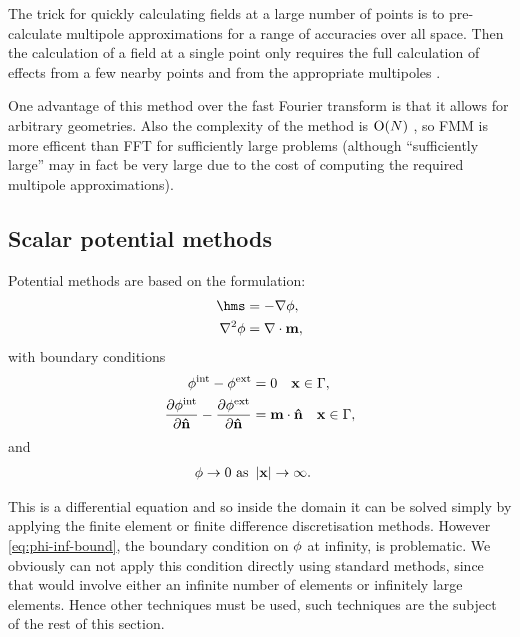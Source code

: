 The trick for quickly calculating fields at a large number of points is to pre-calculate multipole approximations for a range of accuracies over all space.
Then the calculation of a field at a single point only requires the full calculation of effects from a few nearby points and from the appropriate multipoles \cite{Beatson1997}.

One advantage of this method over the fast Fourier transform is that it allows for arbitrary geometries.
Also the complexity of the method is $\text{O}{\left( N \right)}$ \cite{Chang2011}, so FMM is more efficent than FFT for sufficiently large problems (although ``sufficiently large'' may in fact be very large due to the cost of computing the required multipole approximations).


\subsection{Scalar potential methods}
\label{sec:magstat-field-calc-pote}

Potential methods are based on the formulation:
\begin{equation}
  \begin{aligned}
    \label{eq:Hms2}
    \hms &= - \nabla \phim, \\
    \lap \phim &= \nabla \cdot \mv,
  \end{aligned}
\end{equation}
with boundary conditions
\begin{equation}
  \begin{aligned}
    \label{eq:cont-phi-bound2}
    \phi^{\text{int}} - \phi^{\text{ext}} &= 0 \quad \mathbf{x} \in {\Gamma}, \\
    \frac{\partial \phi^{\text{int}}}{\partial \mathbf{\hat{n}}} - \frac{\partial \phi^{\text{ext}}}{\partial \mathbf{\hat{n}}} &= \mathbf{m} \cdot \mathbf{\hat{n}} \quad \mathbf{x} \in {\Gamma}, \\
  \end{aligned}
\end{equation}
and
\begin{equation}
  \begin{aligned}
    \label{eq:phi-inf-bound}
    \phi \rightarrow 0 \text{ as } &\left|{\mathbf{x}} \right| \rightarrow \infty.
  \end{aligned}
\end{equation}

This is a differential equation and so inside the domain it can be solved simply by applying the finite element or finite difference discretisation methods.
However \cref{eq:phi-inf-bound}, the boundary condition on $\phi$ at infinity, is problematic.
We obviously can not apply this condition directly using standard methods, since that would involve either an infinite number of elements or infinitely large elements.
Hence other techniques must be used, such techniques are the subject of the rest of this section.

